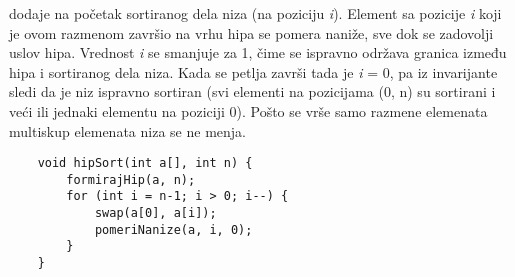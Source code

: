 \documentclass{article}
\begin{document}
dodaje na početak sortiranog dela niza (na poziciju \textit{i}). Element sa pozicije \textit{i} koji
je ovom razmenom završio na vrhu hipa se pomera naniže, sve dok se zadovolji
uslov hipa. Vrednost \textit{i} se smanjuje za 1, čime se ispravno održava granica između hipa i sortiranog dela niza. Kada se petlja završi tada je \textit{i} = 0, pa iz invarijante
sledi da je niz ispravno sortiran (svi elementi na pozicijama (0, n) su sortirani i
veći ili jednaki elementu na poziciji 0). Pošto se vrše samo razmene elemenata
multiskup elemenata niza se ne menja.
\newpage
\begin{lstlisting}
    void hipSort(int a[], int n) {
        formirajHip(a, n);
        for (int i = n-1; i > 0; i--) {
            swap(a[0], a[i]);
            pomeriNanize(a, i, 0);
        }
    }
\end{lstlisting}
\end{document}
